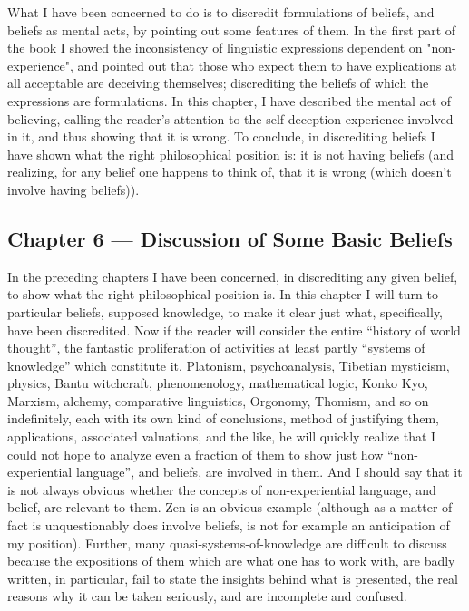 What I have been concerned to do is to discredit formulations of 
beliefs, and beliefs as mental acts, by pointing out some features of them. In 
the first part of the book I showed the inconsistency of linguistic expressions 
dependent on "non-experience", and pointed out that those who expect them 
to have explications at all acceptable are deceiving themselves; discrediting 
the beliefs of which the expressions are formulations. In this chapter, I have 
described the mental act of believing, calling the reader's attention to the 
self-deception experience involved in it, and thus showing that it is wrong. 
To conclude, in discrediting beliefs I have shown what the right 
philosophical position is: it is not having beliefs (and realizing, for any belief 
one happens to think of, that it is wrong (which doesn't involve having beliefs)). 

\subsection*{Chapter 6 --- Discussion of Some Basic Beliefs}

In the preceding chapters I have been concerned, in discrediting any 
given belief, to show what the right philosophical position is. In this chapter 
I will turn to particular beliefs, supposed knowledge, to make it clear just 
what, specifically, have been discredited. Now if the reader will consider the 
entire \enquote{history of world thought}, the fantastic proliferation of activities at 
least partly \enquote{systems of knowledge} which constitute it, Platonism, 
psychoanalysis, Tibetian mysticism, physics, Bantu witchcraft, 
phenomenology, mathematical logic, Konko Kyo, Marxism, alchemy, 
comparative linguistics, Orgonomy, Thomism, and so on indefinitely, each 
with its own kind of conclusions, method of justifying them, applications, 
associated valuations, and the like, he will quickly realize that I could not 
hope to analyze even a fraction of them to show just how \enquote{non-experiential 
language}, and beliefs, are involved in them. And I should say that it is not 
always obvious whether the concepts of non-experiential language, and 
belief, are relevant to them. Zen is an obvious example (although as a matter 
of fact is unquestionably does involve beliefs, is not for example an 
anticipation of my position). Further, many quasi-systems-of-knowledge are 
difficult to discuss because the expositions of them which are what one has 
to work with, are badly written, in particular, fail to state the insights behind 
what is presented, the real reasons why it can be taken seriously, and are 
incomplete and confused. 

